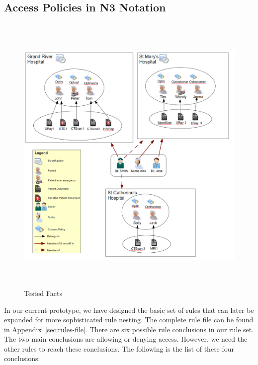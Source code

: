 \documentclass[conference]{IEEEtran}
\begin{document}
\subsection{Access Policies in N3 Notation}
\label{rules-sec}

\begin{figure}[t]
\centering
\includegraphics[width=16cm,height=14cm]{BigPicture.png}
\caption{Tested Facts}
\label{fig:allfacts}
\end{figure}

In our current prototype, we have designed the basic set of rules that can later be expanded for more sophisticated rule nesting. The complete rule file can be
found in Appendix~\ref{sec:rules-file}. There are six possible rule conclusions in our rule set. The two main conclusions are allowing or denying
access. However, we need the other rules to reach these conclusions. The following is the list of these four conclusions:
\end{document}
